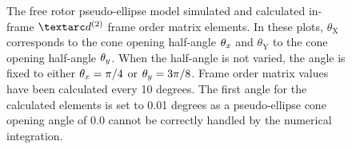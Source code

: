 \begin{figure}
\begin{tabular}{@{}cc@{}}
  \end{tabular}
  \caption[Free rotor pseudo-ellipse simulated and calculated in-frame Daeg$^{(2)}$ elements.]{
    The free rotor pseudo-ellipse model simulated and calculated in-frame $\FOtwo$ frame order matrix elements.
    In these plots, $\theta_\textrm{X}$ corresponds to the cone opening half-angle $\theta_x$ and $\theta_\textrm{Y}$ to the cone opening half-angle $\theta_y$.
    When the half-angle is not varied, the angle is fixed to either $\theta_x = \pi/4$ or $\theta_y = 3\pi/8$.
    Frame order matrix values have been calculated every 10 degrees.
    The first angle for the calculated elements is set to 0.01 degrees as a pseudo-ellipse cone opening angle of 0.0 cannot be correctly handled by the numerical integration.
  }
  \label{fig: simulated and calculated in-frame 2nd degree pseudo-ellipse, free rotor frame order}
\end{figure}

